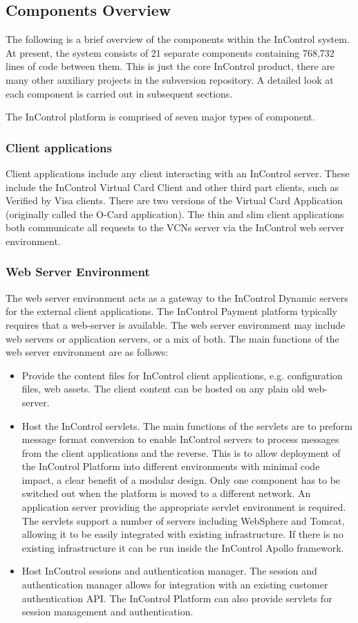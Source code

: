 \documentclass[a4paper, 11pt, titlepage]{article}
\begin{document}
\subsection{Components Overview} 
The following is a brief overview of the components within the InControl system. At present, the system consists of 21 separate components containing 768,732\cite{SLOC} lines of code between them. This is just the core InControl product, there are many other auxiliary projects in the subversion repository. A detailed look at each component is carried out in subsequent sections. 
 
The InControl platform is comprised of seven major types of component. 
\subsubsection{Client applications} 
Client applications include any client interacting with an InControl server. These include the InControl Virtual Card Client and other third part clients, such as Verified by Visa clients. There are two versions of the Virtual Card Application (originally called the O-Card application). The thin and slim client applications both communicate all requests to the VCNs server via the InControl web server environment. 
\subsubsection{Web Server Environment} 
The web server environment acts as a gateway to the InControl Dynamic servers for the external client applications. The InControl Payment platform typically requires that a web-server is available. The web server environment may include web servers or application servers, or a mix of both. The main functions of the web server environment are as follows: 
\begin{itemize} 
\item Provide the content files for InControl client applications, e.g. configuration files, web assets. The client content can be hosted on any plain old web-server. 
\item Host the InControl servlets. The main functions of the servlets are to preform message format conversion to enable InControl servers to process messages from the client applications and the reverse. This is to allow deployment of the InControl Platform into different environments with minimal code impact, a clear benefit of a modular design. Only one component has to be switched out when the platform is moved to a different network. An application server providing the appropriate servlet environment is required. The servlets support a number of servers including WebSphere and Tomcat, allowing it to be easily integrated with existing infrastructure. If there is no existing infrastructure it can be run inside the InControl Apollo framework.  
\item Host InControl sessions and authentication manager. The session and authentication manager allows for integration with an existing customer authentication API. The InControl Platform can also provide servlets for session management and authentication. 
\end{itemize} 
\end{document}

